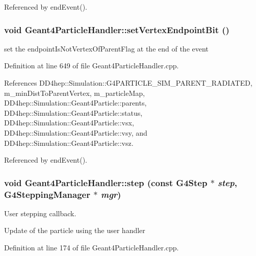 Referenced by endEvent().\hypertarget{class_d_d4hep_1_1_simulation_1_1_geant4_particle_handler_a1e75f073fa789609d31025fa7af977e8}{
\subsubsection[{setVertexEndpointBit}]{\setlength{\rightskip}{0pt plus 5cm}void Geant4ParticleHandler::setVertexEndpointBit ()}}
\label{class_d_d4hep_1_1_simulation_1_1_geant4_particle_handler_a1e75f073fa789609d31025fa7af977e8}


set the endpointIsNotVertexOfParentFlag at the end of the event 

Definition at line 649 of file Geant4ParticleHandler.cpp.

References DD4hep::Simulation::G4PARTICLE\_\-SIM\_\-PARENT\_\-RADIATED, m\_\-minDistToParentVertex, m\_\-particleMap, DD4hep::Simulation::Geant4Particle::parents, DD4hep::Simulation::Geant4Particle::status, DD4hep::Simulation::Geant4Particle::vsx, DD4hep::Simulation::Geant4Particle::vsy, and DD4hep::Simulation::Geant4Particle::vsz.

Referenced by endEvent().\hypertarget{class_d_d4hep_1_1_simulation_1_1_geant4_particle_handler_abb534226cfb8d022077d48681226a179}{
\subsubsection[{step}]{\setlength{\rightskip}{0pt plus 5cm}void Geant4ParticleHandler::step (const G4Step $\ast$ {\em step}, \/  G4SteppingManager $\ast$ {\em mgr})}}
\label{class_d_d4hep_1_1_simulation_1_1_geant4_particle_handler_abb534226cfb8d022077d48681226a179}


User stepping callback. 

Update of the particle using the user handler 

Definition at line 174 of file Geant4ParticleHandler.cpp.

